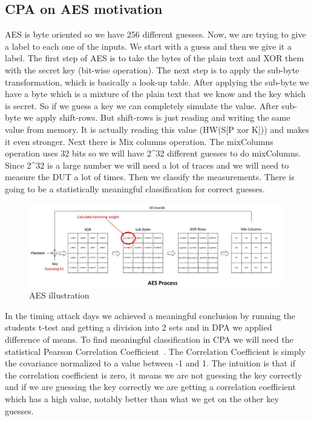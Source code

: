 \subsection{CPA on AES motivation}

AES is byte oriented so we have 256 different guesses. Now, we are trying to
give a label to each one of the inputs. We start with a guess and then we give it
a label. The first step of AES is to take the bytes of the plain text and XOR
them with the secret key (bit-wise operation). The next step is to apply the sub-byte
transformation, which is basically a look-up table. After applying the sub-byte we
have a byte which is a mixture of the plain text that we know and the key which
is secret. So if we guess a key we can completely simulate the value. After
sub-byte we apply shift-rows. But shift-rows is just reading and writing the same
value from memory. It is actually reading this value (HW(S[P xor K])) and makes it
even stronger. Next there is Mix columns operation. The mixColumns operation
uses 32 bits so we will have 2^32 different guesses to do mixColumns. Since 2^32
is a large number we will need a lot of traces and we will need to measure the DUT a lot
of times. Then we classify the measurements. There is going to be a statistically
meaningful classification for correct guesses.

\begin{figure}[!ht]
    \centering
    \includegraphics[width=1.0\textwidth]{images/chapter8/aes_process.jpg}
    \caption{AES illustration} \label{c8_aes:fig}
\end{figure}

In the timing attack days we achieved a meaningful conclusion by running the students t-test
and getting a division into 2 sets and in DPA we applied difference of means. To find
meaningful classification in CPA we will need the statistical Pearson
Correlation Coefficient~\cite{PearsonCorrelationCoefficient}. The Correlation
Coefficient is simply the covariance normalized to a value between -1 and 1. The
intuition is that if the correlation coefficient is zero, it means we are
not guessing the key correctly and if we are guessing the key correctly we are
getting a correlation coefficient which has a high value, notably better than what we get
on the other key guesses. 

